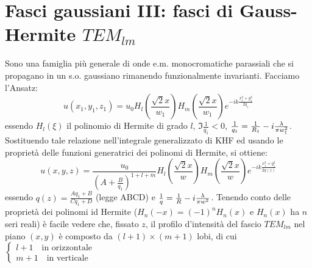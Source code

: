 \section{Fasci gaussiani III: fasci di Gauss-Hermite $TEM_{lm}$}
Sono una famiglia più generale di onde e.m. monocromatiche parassiali che si propagano in un s.o. gaussiano rimanendo funzionalmente invarianti. Facciamo l'Ansatz:
\begin{equation*}
u(x_1,y_1,z_1) = u_0 H_l\left(\frac{\sqrt{2} x}{w_1}\right) H_m\left(\frac{\sqrt{2} x}{w_1}\right) e^{-ik\frac{x_1^2 + y_1^2}{2q_1}}
\end{equation*}
essendo $H_l(\xi)$ il polinomio di Hermite di grado $l$, $\Im{\frac{1}{q_1}} < 0$, $\frac{1}{q_1} = \frac{1}{R_1} - i\frac{\lambda}{\pi w_1^2}$.
Sostituendo tale relazione nell'integrale generalizzato di KHF ed usando le proprietà delle funzioni generatrici dei polinomi di Hermite, si ottiene:
\begin{equation*}
u(x,y,z) = \frac{u_0}{\left( A + \frac{B}{q_1}\right)^{1+l+m}} H_l\left(\frac{\sqrt{2} x}{w}\right) H_m\left(\frac{\sqrt{2} x}{w}\right) e^{-ik\frac{x_1^2 + y_1^2}{2q(z)}}
\end{equation*}
essendo $q(z) = \frac{Aq_1 + B}{Cq_1 + D}$ (legge ABCD) e $\frac{1}{q} = \frac{1}{R} -i \frac{\lambda}{\pi w^2}$.
Tenendo conto delle proprietà dei polinomi id Hermite ($H_n(-x) = (-1)^n H_n(x)$ e $H_n(x)$ ha $n$ seri reali) è facile vedere che, fissato $z$, il profilo d'intensità del fascio $TEM_{lm}$ nel piano $(x,y)$ è composto da $(l+1)\times(m+1)$ lobi, di cui
$\begin{cases}
l+1 \quad \text{in orizzontale}\\
m+1 \quad \text{in verticale}
\end{cases}$
